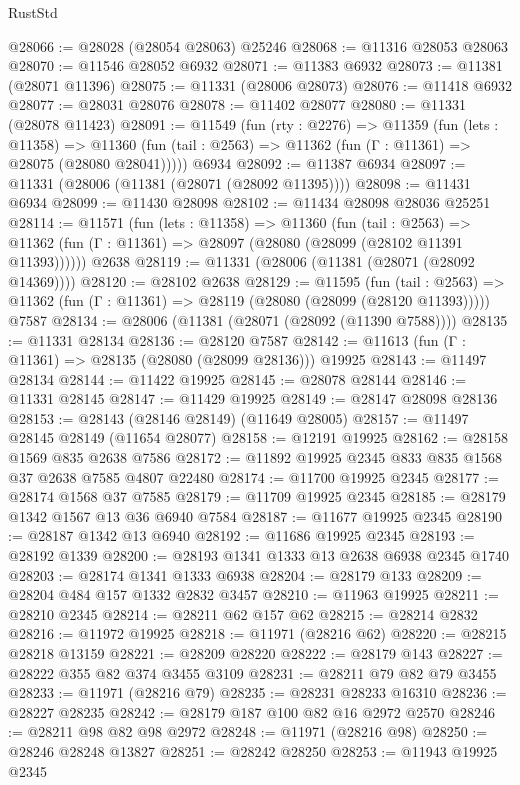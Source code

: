 \begin{lexlean}{RustStd}
\begin{coremodule}
@28066 := @28028 (@28054 @28063) @25246
@28068 := @11316 @28053 @28063
@28070 := @11546 @28052 @6932
@28071 := @11383 @6932
@28073 := @11381 (@28071 @11396)
@28075 := @11331 (@28006 @28073)
@28076 := @11418 @6932
@28077 := @28031 @28076
@28078 := @11402 @28077
@28080 := @11331 (@28078 @11423)
@28091 := @11549
    (fun (rty : @2276) =>
    @11359
      (fun (lets : @11358) =>
      @11360 (fun (tail : @2563) => @11362 (fun (Γ : @11361) => @28075 (@28080 @28041)))))
    @6934
@28092 := @11387 @6934
@28097 := @11331 (@28006 (@11381 (@28071 (@28092 @11395))))
@28098 := @11431 @6934
@28099 := @11430 @28098
@28102 := @11434 @28098 @28036 @25251
@28114 := @11571
    (fun (lets : @11358) =>
    @11360
      (fun (tail : @2563) =>
      @11362 (fun (Γ : @11361) => @28097 (@28080 (@28099 (@28102 @11391 @11393))))))
    @2638
@28119 := @11331 (@28006 (@11381 (@28071 (@28092 @14369))))
@28120 := @28102 @2638
@28129 := @11595
    (fun (tail : @2563) => @11362 (fun (Γ : @11361) => @28119 (@28080 (@28099 (@28120 @11393)))))
    @7587
@28134 := @28006 (@11381 (@28071 (@28092 (@11390 @7588))))
@28135 := @11331 @28134
@28136 := @28120 @7587
@28142 := @11613 (fun (Γ : @11361) => @28135 (@28080 (@28099 @28136))) @19925
@28143 := @11497 @28134
@28144 := @11422 @19925
@28145 := @28078 @28144
@28146 := @11331 @28145
@28147 := @11429 @19925
@28149 := @28147 @28098 @28136
@28153 := @28143 (@28146 @28149) (@11649 @28005)
@28157 := @11497 @28145 @28149 (@11654 @28077)
@28158 := @12191 @19925
@28162 := @28158 @1569 @835 @2638 @7586
@28172 := @11892 @19925 @2345 @833 @835 @1568 @37 @2638 @7585 @4807 @22480
@28174 := @11700 @19925 @2345
@28177 := @28174 @1568 @37 @7585
@28179 := @11709 @19925 @2345
@28185 := @28179 @1342 @1567 @13 @36 @6940 @7584
@28187 := @11677 @19925 @2345
@28190 := @28187 @1342 @13 @6940
@28192 := @11686 @19925 @2345
@28193 := @28192 @1339
@28200 := @28193 @1341 @1333 @13 @2638 @6938 @2345 @1740
@28203 := @28174 @1341 @1333 @6938
@28204 := @28179 @133
@28209 := @28204 @484 @157 @1332 @2832 @3457
@28210 := @11963 @19925
@28211 := @28210 @2345
@28214 := @28211 @62 @157 @62
@28215 := @28214 @2832
@28216 := @11972 @19925
@28218 := @11971 (@28216 @62)
@28220 := @28215 @28218 @13159
@28221 := @28209 @28220
@28222 := @28179 @143
@28227 := @28222 @355 @82 @374 @3455 @3109
@28231 := @28211 @79 @82 @79 @3455
@28233 := @11971 (@28216 @79)
@28235 := @28231 @28233 @16310
@28236 := @28227 @28235
@28242 := @28179 @187 @100 @82 @16 @2972 @2570
@28246 := @28211 @98 @82 @98 @2972
@28248 := @11971 (@28216 @98)
@28250 := @28246 @28248 @13827
@28251 := @28242 @28250
@28253 := @11943 @19925 @2345

\end{coremodule}
\end{lexlean}
